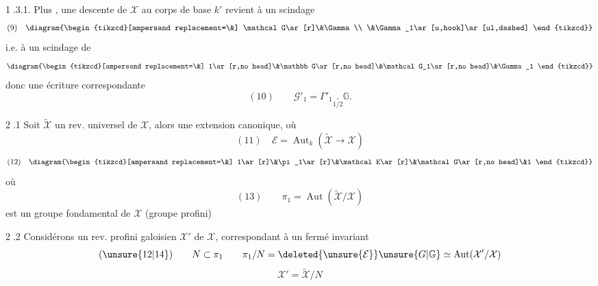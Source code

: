 \textcircled{1.3.1.} Plus , une descente de $\mathcal X$ au corps de base $k'$ revient à un scindage
\[
(9)\quad\diagram{\begin{tikzcd}[ampersand replacement=\&]
\mathcal G\ar[r]\&\Gamma\\
\&\Gamma_1\ar[u,hook]\ar[ul,dashed]
\end{tikzcd}}
\]
i.e. à un scindage de
\[
\diagram{\begin{tikzcd}[ampersand replacement=\&]
1\ar[r,no head]\&\mathbb G\ar[r,no head]\&\mathcal G_1\ar[r,no head]\&\Gamma_1
\end{tikzcd}}
\]
donc une écriture correspondante
\[
(10)\qquad\mathcal G'_1=\Gamma'_1\mathbin{\underset{\scriptscriptstyle1/2}{.}}\mathbb G.
\]

\textcircled{2.1} Soit $\widetilde{\mathcal X}$ un rev. universel  de $\mathcal X$,  \deleted{[plus gén. un rev. profini galoisien}  alors une extension canonique, où
\[
(11)\quad\mathcal E=\operatorname{Aut}_k(\widetilde{\mathcal X}\longrightarrow\mathcal X)
\]
\[
(12)\quad\diagram{\begin{tikzcd}[ampersand replacement=\&]
1\ar[r]\&\pi_1\ar[r]\&\mathcal E\ar[r]\&\mathcal G\ar[r,no head]\&1
\end{tikzcd}}
\]
où
\[
(13)\qquad\pi_1=\operatorname{Aut}(\widetilde{\mathcal X}/\mathcal X)
\]
est un groupe fondamental de $\mathcal X$ (groupe profini)


\textcircled{2.2} Considérons un rev. profini galoisien $\mathcal X'$ de $\mathcal X$, correspondant à un  fermé invariant
\[
(\unsure{12|14})\qquad N\subset\pi_1\qquad \pi_1/N=\deleted{\unsure{\mathcal E}}\unsure{G|\mathbb G}\simeq\operatorname{Aut}(\mathcal X'/\mathcal X)
\]
\[
\mathcal X'=\widetilde{\mathcal X}/N
\]

